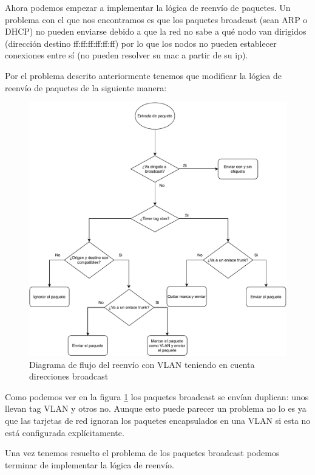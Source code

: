 Ahora podemos empezar a implementar la lógica de reenvío de paquetes. Un problema con el que nos encontramos es que los paquetes broadcast (sean ARP o DHCP) no pueden enviarse debido a que la red no sabe a qué nodo van dirigidos (dirección destino ff:ff:ff:ff:ff:ff) por lo que los nodos no pueden establecer conexiones entre sí (no pueden resolver su mac a partir de su ip).

Por el problema descrito anteriormente tenemos que modificar la lógica de reenvío de paquetes de la siguiente manera:

\begin{figure}[!h]
    \centering
    \includegraphics[width=\textwidth]{imagenes/figuras/decisiones_vlan2.pdf}
    \caption{Diagrama de flujo del reenvío con VLAN teniendo en cuenta direcciones broadcast}
    \label{fig:decisiones-vlan2}
\end{figure}

Como podemos ver en la figura \ref{fig:decisiones-vlan2} los paquetes broadcast se envían duplican: unos llevan tag VLAN y otros no. Aunque esto puede parecer un problema no lo es ya que las tarjetas de red ignoran los paquetes encapsulados en una VLAN si esta no está configurada explícitamente.

Una vez tenemos resuelto el problema de los paquetes broadcast podemos terminar de implementar la lógica de reenvío.

